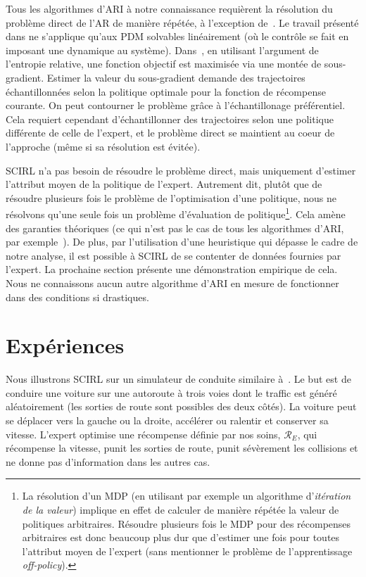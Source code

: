 \documentclass[french,utf8]{./hermes-journal}
\newcommand{\R}{\mathcal{R}}
\begin{document}
Tous les algorithmes d'ARI à notre connaissance requièrent la résolution du problème direct de l'AR de manière répétée, à l'exception de~\cite{Dvi010,boularia011}.
Le travail présenté dans \cite{Dvi010} ne s'applique qu'aux PDM solvables linéairement (où le contrôle se fait en imposant une dynamique au système).
Dans~\cite{boularia011}, en utilisant l'argument de l'entropie relative, une fonction objectif est maximisée via une montée de sous-gradient. Estimer la valeur du sous-gradient demande des trajectoires échantillonnées selon la politique optimale pour la fonction de récompense courante. On peut contourner le problème grâce à l'échantillonage préférentiel. Cela requiert cependant d'échantillonner des trajectoires selon une politique différente de celle de l'expert, et le problème direct se maintient au coeur de l'approche (même si sa résolution est évitée).

SCIRL n'a pas besoin de résoudre le problème direct, mais uniquement d'estimer l'attribut moyen de la politique de l'expert. Autrement dit, plutôt que de résoudre plusieurs fois le problème de l'optimisation d'une politique, nous ne résolvons qu'une seule fois un problème d'évaluation de politique\footnote{La résolution d'un MDP (en utilisant par exemple un algorithme d'\emph{itération de la valeur}) implique en effet de calculer de manière répétée la valeur de politiques arbitraires. Résoudre plusieurs fois le MDP pour des récompenses arbitraires est donc beaucoup plus dur que d'estimer une fois pour toutes l'attribut moyen de l'expert (sans mentionner le problème de l'apprentissage \emph{off-policy}).}. Cela amène des garanties théoriques (ce qui n'est pas le cas de tous les algorithmes d'ARI, par exemple~\cite{boularia011}). De plus, par l'utilisation d'une heuristique qui dépasse le cadre de notre analyse, il est possible à SCIRL de se contenter de données fournies par l'expert. La prochaine section présente une démonstration empirique de cela. Nous ne connaissons aucun autre algorithme d'ARI en mesure de fonctionner dans des conditions si drastiques.


\section{Expériences}
\label{sexperiments}

Nous illustrons SCIRL sur un simulateur de conduite similaire à~\cite{Abbee004,Sye00ame}.  Le but est de conduire une voiture sur une autoroute à trois voies dont le traffic est généré aléatoirement (les sorties de route sont possibles des deux côtés). La voiture peut se déplacer vers la gauche ou la droite, accélérer ou ralentir et conserver sa vitesse. L'expert optimise une récompense définie par nos soins, $\R_E$, qui récompense la vitesse, punit les sorties de route, punit sévèrement les collisions et ne donne pas d'information dans les autres cas.
\end{document}

